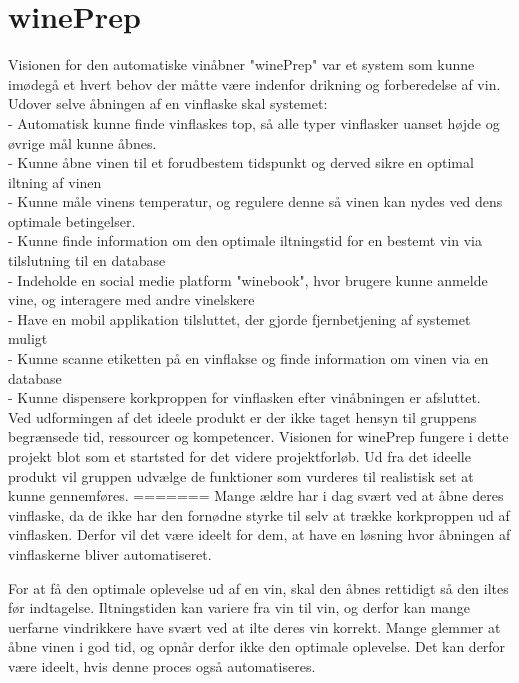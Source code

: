 \section{winePrep}
Visionen for den automatiske vinåbner "winePrep" var et system som kunne imødegå et hvert behov der måtte være indenfor drikning og forberedelse af vin. \\
Udover selve åbningen af en vinflaske skal systemet:\\
- Automatisk kunne finde vinflaskes top, så alle typer vinflasker uanset højde og øvrige mål kunne åbnes.\\ 
- Kunne åbne vinen til et forudbestem tidspunkt og derved sikre en optimal iltning af vinen\\
- Kunne måle vinens temperatur, og regulere denne så vinen kan nydes ved dens optimale betingelser.\\
- Kunne finde information om den optimale iltningstid for en bestemt vin via tilslutning til en database\\
- Indeholde en social medie platform "winebook", hvor brugere kunne anmelde vine, og interagere med andre vinelskere\\
- Have en mobil applikation tilsluttet, der gjorde fjernbetjening af systemet muligt\\
- Kunne scanne etiketten på en vinflakse og finde information om vinen via en database\\
- Kunne dispensere korkproppen for vinflasken efter vinåbningen er afsluttet.\\

Ved udformingen af det ideele produkt er der ikke taget hensyn til gruppens begrænsede tid, ressourcer og kompetencer. Visionen for winePrep fungere
i dette projekt blot som et startsted for det videre projektforløb. Ud fra det ideelle produkt vil gruppen udvælge de funktioner som vurderes til realistisk
set at kunne gennemføres. 
=======
Mange ældre har i dag svært ved at åbne deres vinflaske, da de ikke har den fornødne styrke til selv at trække korkproppen ud af vinflasken. Derfor vil det være ideelt for dem, at have en løsning hvor åbningen af vinflaskerne bliver automatiseret.

For at få den optimale oplevelse ud af en vin, skal den åbnes rettidigt så den iltes før indtagelse. Iltningstiden kan variere fra vin til vin, og derfor kan mange uerfarne vindrikkere have svært ved at ilte deres vin korrekt. Mange glemmer at åbne vinen i god tid, og opnår derfor ikke den optimale oplevelse. Det kan derfor være ideelt, hvis denne proces også automatiseres.


